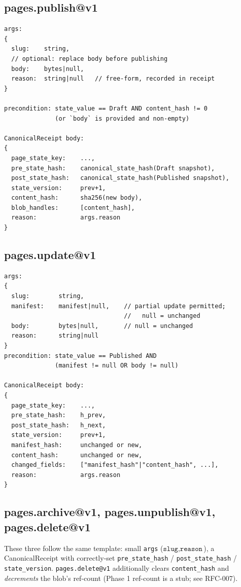 \documentclass[11pt,a4paper]{article}
\theoremstyle{definition}
\begin{document}
\subsection{pages.publish@v1}

\begin{lstlisting}
args:
{
  slug:    string,
  // optional: replace body before publishing
  body:    bytes|null,
  reason:  string|null   // free-form, recorded in receipt
}

precondition: state_value == Draft AND content_hash != 0
              (or `body` is provided and non-empty)

CanonicalReceipt body:
{
  page_state_key:    ...,
  pre_state_hash:    canonical_state_hash(Draft snapshot),
  post_state_hash:   canonical_state_hash(Published snapshot),
  state_version:     prev+1,
  content_hash:      sha256(new body),
  blob_handles:      [content_hash],
  reason:            args.reason
}
\end{lstlisting}

\subsection{pages.update@v1}

\begin{lstlisting}
args:
{
  slug:        string,
  manifest:    manifest|null,    // partial update permitted;
                                 //   null = unchanged
  body:        bytes|null,       // null = unchanged
  reason:      string|null
}
precondition: state_value == Published AND
              (manifest != null OR body != null)

CanonicalReceipt body:
{
  page_state_key:    ...,
  pre_state_hash:    h_prev,
  post_state_hash:   h_next,
  state_version:     prev+1,
  manifest_hash:     unchanged or new,
  content_hash:      unchanged or new,
  changed_fields:    ["manifest_hash"|"content_hash", ...],
  reason:            args.reason
}
\end{lstlisting}

\subsection{pages.archive@v1, pages.unpublish@v1, pages.delete@v1}

These three follow the same template: small \texttt{args}
($\texttt{slug}, \texttt{reason}$), a CanonicalReceipt with
correctly-set \texttt{pre\_state\_hash} / \texttt{post\_state\_hash}
/ \texttt{state\_version}. \texttt{pages.delete@v1} additionally
clears \texttt{content\_hash} and \emph{decrements} the blob's
ref-count (Phase 1 ref-count is a stub; see RFC-007).
\end{document}
